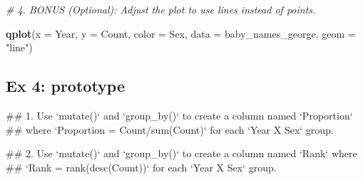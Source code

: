 \documentclass[]{book}
\newenvironment{Shaded}{\begin{snugshade}}{\end{snugshade}}
\newcommand{\KeywordTok}[1]{\textcolor[rgb]{0.13,0.29,0.53}{\textbf{#1}}}
\newcommand{\DataTypeTok}[1]{\textcolor[rgb]{0.13,0.29,0.53}{#1}}
\newcommand{\StringTok}[1]{\textcolor[rgb]{0.31,0.60,0.02}{#1}}
\newcommand{\CommentTok}[1]{\textcolor[rgb]{0.56,0.35,0.01}{\textit{#1}}}
\newcommand{\OperatorTok}[1]{\textcolor[rgb]{0.81,0.36,0.00}{\textbf{#1}}}
\newcommand{\NormalTok}[1]{#1}
\begin{document}
\begin{Shaded}
\begin{Highlighting}[]
\CommentTok{# 4.  BONUS (Optional): Adjust the plot to use lines instead of points.}
\end{Highlighting}
\end{Shaded}

\begin{Shaded}
\begin{Highlighting}[]
\KeywordTok{qplot}\NormalTok{(}\DataTypeTok{x =}\NormalTok{ Year, }\DataTypeTok{y =}\NormalTok{ Count, }\DataTypeTok{color =}\NormalTok{ Sex, }\DataTypeTok{data =}\NormalTok{ baby_names_george, }\DataTypeTok{geom =} \StringTok{"line"}\NormalTok{)}
\end{Highlighting}
\end{Shaded}

\subsection{Ex 4: prototype}\label{ex-4-prototype}

\begin{Shaded}
\begin{Highlighting}[]
\NormalTok{## 1.  Use `mutate()` and `group_by()` to create a column named `Proportion`}
\NormalTok{##     where `Proportion = Count/sum(Count)` for each `Year X Sex` group.}
\end{Highlighting}
\end{Shaded}

\begin{Shaded}
\end{Shaded}

\begin{Shaded}
\begin{Highlighting}[]
\NormalTok{## 2.  Use `mutate()` and `group_by()` to create a column named `Rank` where }
\NormalTok{##     `Rank = rank(desc(Count))` for each `Year X Sex` group.}
\end{Highlighting}
\end{Shaded}
\end{document}
